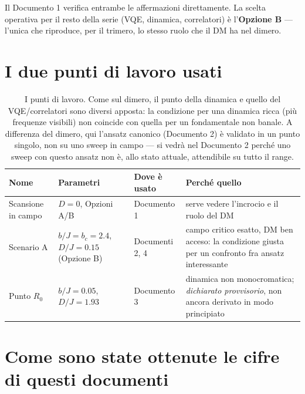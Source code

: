 \documentclass[11pt,a4paper]{article}
\begin{document}
Il Documento 1 verifica entrambe le affermazioni direttamente. La scelta
operativa per il resto della serie (VQE, dinamica, correlatori) è
l'\textbf{Opzione B} --- l'unica che riproduce, per il trimero, lo stesso
ruolo che il DM ha nel dimero.


\section{I due punti di lavoro usati}

\begin{table}[htbp]
\centering
\footnotesize
\renewcommand{\arraystretch}{1.35}
\begin{tabular}{@{}p{2.5cm}p{3.6cm}p{2.3cm}p{5.8cm}@{}}
\toprule
\rowcolor{grigetto}
\textbf{Nome} & \textbf{Parametri} & \textbf{Dove è usato} & \textbf{Perché quello} \\
\midrule
Scansione in campo & $D=0$, Opzioni A/B & Documento 1 & serve vedere l'incrocio e il ruolo del DM \\
Scenario A & $b/J=b_c=2.4$, $D/J=0.15$ (Opzione B) & Documenti 2, 4 & campo critico esatto, DM ben acceso: la condizione giusta per un confronto fra ansatz interessante \\
Punto $R_0$ & $b/J=0.05$, $D/J=1.93$ & Documento 3 & dinamica non monocromatica; \emph{dichiarato provvisorio}, non ancora derivato in modo principiato \\
\bottomrule
\end{tabular}
\caption{I punti di lavoro. Come sul dimero, il punto della dinamica e quello
del VQE/correlatori sono diversi apposta: la condizione per una dinamica
ricca (più frequenze visibili) non coincide con quella per un fondamentale
non banale. A differenza del dimero, qui l'ansatz canonico (Documento 2) è
validato in un punto singolo, non su uno sweep in campo --- si vedrà nel
Documento 2 perché uno sweep con questo ansatz non è, allo stato attuale,
attendibile su tutto il range.}
\end{table}
\FloatBarrier

\section{Come sono state ottenute le cifre di questi documenti}
\end{document}
